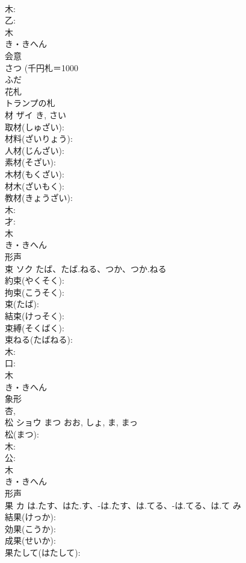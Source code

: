 \documentclass[8pt]{extreport}
\begin{document}
\begin{CJK}{UTF8}{min}
\\	木: 
\\	乙: 
\\	木	
\\	き・きへん	
\\	会意 
\\	さつ (千円札＝1000 
\\	ふだ 
\\	花札 
\\	トランプの札 
\\	材	ザイ		き, さい	
\\	取材(しゅざい): 
\\	材料(ざいりょう): 
\\	人材(じんざい): 
\\	素材(そざい): 
\\	木材(もくざい): 
\\	材木(ざいもく): 
\\	教材(きょうざい): 
\\	木: 
\\	才: 
\\	木	
\\	き・きへん	
\\	形声 
\\	束	ソク	たば、たば.ねる、つか、つか.ねる		
\\	約束(やくそく): 
\\	拘束(こうそく): 
\\	束(たば): 
\\	結束(けっそく): 
\\	束縛(そくばく): 
\\	束ねる(たばねる): 
\\	木: 
\\	口: 
\\	木	
\\	き・きへん	
\\	象形 
\\	杏, 
\\	松	ショウ	まつ	おお, しょ, ま, まっ	
\\	松(まつ): 
\\	木: 
\\	公: 
\\	木	
\\	き・きへん	
\\	形声 
\\	果	カ	は.たす、はた.す、-は.たす、は.てる、-は.てる、は.て	み	
\\	結果(けっか): 
\\	効果(こうか): 
\\	成果(せいか): 
\\	果たして(はたして): 

\end{CJK}
\end{document}
